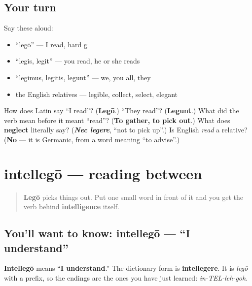 \subsection*{Your turn}
Say these aloud:

\begin{itemize}
\raggedright
  \item \textquotedblleft{}legō\textquotedblright{} — I read, hard g
  \item \textquotedblleft{}legis, legit\textquotedblright{} — you read, he or she reads
  \item \textquotedblleft{}legimus, legitis, legunt\textquotedblright{} — we, you all, they
  \item the English relatives — legible, collect, select, elegant
\end{itemize}

\begin{tcolorbox}[breakable,colback=teal!4,colframe=teal!35!black,title={Before you move on}]
How does Latin say \textquotedblleft{}I read\textquotedblright{}? (\textbf{Legō}.) \textquotedblleft{}They read\textquotedblright{}? (\textbf{Legunt}.) What did the verb mean before it meant \textquotedblleft{}read\textquotedblright{}? (\textbf{To gather, to pick out}.) What does \textbf{neglect} literally say? (\emph{\textbf{Nec legere}}, \textquotedblleft{}not to pick up\textquotedblright{}.) Is English \emph{read} a relative? (\textbf{No} — it is Germanic, from a word meaning \textquotedblleft{}to advise\textquotedblright{}.)
\end{tcolorbox}
\section[intellegō, intellegere]{intellegō — reading between}

\label{lesson:LA-C38-intellego}



\begin{quote}
\textbf{Legō} picks things out. Put one small word in front of it and you get the verb behind \textbf{intelligence} itself.
\end{quote}

\subsection*{You'll want to know: intellegō — \textquotedblleft{}I understand\textquotedblright{}}
\textbf{Intellegō} means \textquotedblleft{}\textbf{I understand}.\textquotedblright{} The dictionary form is \textbf{intellegere}. It is \emph{legō} with a prefix, so the endings are the ones you have just learned: \emph{in-TEL-leh-goh}.

